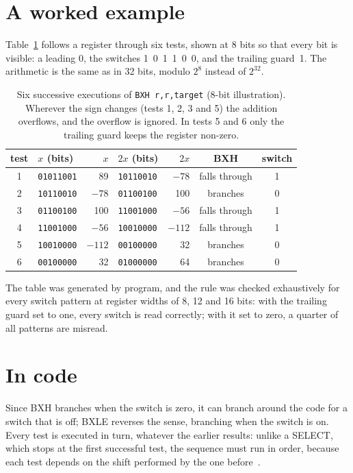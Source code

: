 \documentclass[11pt]{article}
\begin{document}
\section{A worked example}

Table~\ref{tab:walk} follows a register through six tests, shown at 8 bits
so that every bit is visible: a leading 0, the switches 1~0~1~1~0~0, and the
trailing guard~1. The arithmetic is the same as in 32 bits, modulo $2^8$
instead of $2^{32}$.

\begin{table}[ht]
\centering
\begin{tabular}{clrlrcc}
\toprule
test & $x$ (bits) & $x$ & $2x$ (bits) & $2x$ & BXH & switch \\
\midrule
1 & \texttt{01011001} &   89 & \texttt{10110010} &  $-78$ & falls through & 1 \\
2 & \texttt{10110010} &  $-78$ & \texttt{01100100} &  100 & branches & 0 \\
3 & \texttt{01100100} &  100 & \texttt{11001000} &  $-56$ & falls through & 1 \\
4 & \texttt{11001000} &  $-56$ & \texttt{10010000} & $-112$ & falls through & 1 \\
5 & \texttt{10010000} & $-112$ & \texttt{00100000} &   32 & branches & 0 \\
6 & \texttt{00100000} &   32 & \texttt{01000000} &   64 & branches & 0 \\
\bottomrule
\end{tabular}
\caption{Six successive executions of \texttt{BXH r,r,target} (8-bit
illustration). Wherever the sign changes (tests 1, 2, 3 and 5) the addition
overflows, and the overflow is ignored. In tests 5 and 6 only the trailing
guard keeps the register non-zero.}
\label{tab:walk}
\end{table}

The table was generated by program, and the rule was checked exhaustively
for every switch pattern at register widths of 8, 12 and 16 bits: with the
trailing guard set to one, every switch is read correctly; with it set to
zero, a quarter of all patterns are misread.

\section{In code}

Since BXH branches when the switch is zero, it can branch around the code
for a switch that is off; BXLE reverses the sense, branching when the switch
is on. Every test is executed in turn, whatever the earlier results: unlike a
SELECT, which stops at the first successful test, the sequence must run in
order, because each test depends on the shift performed by the one
before~\cite{ibmmain2024}.
\end{document}
